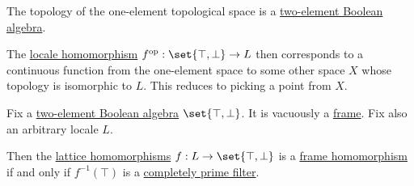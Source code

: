 \begin{remark}\label{rem:picking_a_point_from_a_locale}
  The topology of the one-element topological space is a \hyperref[def:boolean_algebra/trivial]{two-element Boolean algebra}.

  The \hyperref[def:category_of_small_locales]{locale homomorphism} \( f^{\opcat}: \set{ \top, \bot } \to L \) then corresponds to a continuous function from the one-element space to some other space \( X \) whose topology is isomorphic to \( L \). This reduces to picking a point from \( X \).
\end{remark}

\begin{lemma}\label{thm:frame_homomorphism_kernel}
  Fix a \hyperref[def:boolean_algebra/trivial]{two-element Boolean algebra} \( \set{ \top, \bot } \). It is vacuously a \hyperref[def:category_of_small_locales]{frame}. Fix also an arbitrary locale \( L \).

  Then the \hyperref[def:semilattice/homomorphism]{lattice homomorphisms} \( f: L \to \set{ \top, \bot } \) is a \hyperref[def:category_of_small_frames]{frame homomorphism} if and only if \( f^{-1}(\top) \) is a \hyperref[def:lattice_ideal/prime]{completely prime filter}.
\end{lemma}
